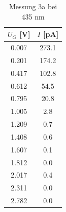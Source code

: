 \documentclass{article}
\begin{document}
\begin{table}[h!]
  \centering
  \begin{tabular}{|c|c|}
      \hline
      $U_G$ [V] & $I$ [pA] \\
      \hline
      0.007 & 273.1 \\
      0.201 & 174.2 \\
      0.417 & 102.8 \\
      0.612 & 54.5  \\
      0.795 & 20.8  \\
      1.005 & 2.8   \\
      1.209 & 0.7   \\
      1.408 & 0.6   \\
      1.607 & 0.1   \\
      1.812 & 0.0   \\
      2.017 & 0.4   \\
      2.311 & 0.0   \\
      2.782 & 0.0   \\
      \hline
  \end{tabular}
  \caption{Messung 3a bei 435 nm}
  \label{tab:messung3a}
\end{table}
\end{document}
